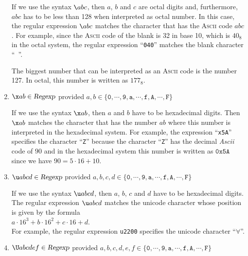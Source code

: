 \begin{enumerate}
      If we use the syntax $\texttt{\symbol{92}}abc$, then $a$, $b$ and $c$ are octal digits and,
      furthermore, $abc$ has to be less than 128 when interpreted as octal number.
      In this case, the regular expression  $\texttt{\symbol{92}}abc$ matches the character that has
      the \textsc{Ascii} code  $abc$.  For example, since the \textsc{Ascii} code of the blank is 32
      in base 10, which is $40_8$ in the octal system, the regular expression
      ``\texttt{040}'' matches the blank character \mbox{``\texttt{ }''}.

      The biggest number that can be interpreted as an \textsc{Ascii} code is the number 127.
      In octal, this number is written as $177_{8}$.
\item $\texttt{\symbol{92}x}ab \in \textsl{Regexp}$ \quad provided $a,b \in \{ \texttt{0}, \cdots, \texttt{9}, \mathtt{a},\cdots, \mathtt{f}, \mathtt{A},\cdots, \mathtt{F} \}$ 

      If we use the syntax $\texttt{\symbol{92}x}ab$, then $a$ and $b$ have to be hexadecimal
      digits.  Then $\texttt{\symbol{92}x}ab$ matches the character that has the number $ab$ where
      this number is interpreted in the hexadecimal system. 
      For example, the expression ``\texttt{x5A}'' specifies the character  ``\texttt{Z}''
      because the character ``\texttt{Z}'' has the decimal \textsl{Ascii} code of $90$ and in the
      hexadecimal system this number is written as $\texttt{0x5A}$ since we have $90 = 5 \cdot 16 + 10$.
\item $\texttt{\symbol{92}u}abcd \in \textsl{Regexp}$ \quad provided $a,b,c,d \in \{ \texttt{0}, \cdots, \texttt{9}, \mathtt{a},\cdots, \mathtt{f}, \mathtt{A},\cdots, \mathtt{F} \}$ 

      If we use the syntax $\texttt{\symbol{92}u}abcd$, then $a$, $b$, $c$ and $d$ have to be
      hexadecimal digits.  The regular expression  $\texttt{\symbol{92}u}abcd$ matches the unicode
      character whose position is given by the formula
      \\[0.2cm]
      \hspace*{1.3cm}
      $a \cdot 16^3 + b \cdot 16^2 + c \cdot 16 + d$.
      \\[0.2cm]
      For example, the regular expression \texttt{u2200} specifies the unicode character ``$\forall$''.
\item $\texttt{\symbol{92}U}abcdef \in \textsl{Regexp}$ \quad provided $a,b,c,d,e,f \in \{ \texttt{0}, \cdots, \texttt{9}, \mathtt{a},\cdots, \mathtt{f}, \mathtt{A},\cdots, \mathtt{F} \}$ 


\end{enumerate}
